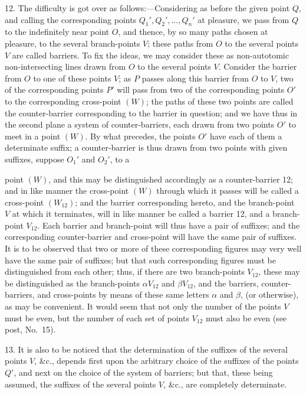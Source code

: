 \documentclass[11pt,a4paper]{article}
\begin{document}
\medskip

12. The difficulty is got over as follows:---Considering as before the given point $Q$, and calling the corresponding points $Q_{1}', Q_{2}', \ldots, Q_{n}'$ at pleasure, we pass from $Q$ to the indefinitely near point $O$, and thence, by so many paths chosen at pleasure, to the several branch-points $V$; these paths from $O$ to the several points $V$ are called barriers. To fix the ideas, we may consider these as non-autotomic non-intersecting lines drawn from $O$ to the several points $V$. Consider the barrier from $O$ to one of these points $V$; as $P$ passes along this barrier from $O$ to $V$, two of the corresponding points $P'$ will pass from two of the corresponding points $O'$ to the corresponding cross-point $(W)$; the paths of these two points are called the counter-barrier corresponding to the barrier in question; and we have thus in the second plane a system of counter-barriers, each drawn from two points $O'$ to meet in a point $(W)$. By what precedes, the points $O'$ have each of them a determinate suffix; a counter-barrier is thus drawn from two points with given suffixes, suppose $O_{1}'$ and $O_{2}'$, to a

\newpage


\noindent point $(W)$, and this may be distinguished accordingly as a counter-barrier 12; and in like manner the cross-point $(W)$ through which it passes will be called a cross-point $(W_{12})$; and the barrier corresponding hereto, and the branch-point $V$ at which it terminates, will in like manner be called a barrier 12, and a branch-point $V_{12}$. Each barrier and branch-point will thus have a pair of suffixes; and the corresponding counter-barrier and cross-point will have the same pair of suffixes. It is to be observed that two or more of these corresponding figures may very well have the same pair of suffixes; but that such corresponding figures must be distinguished from each other; thus, if there are two branch-points $V_{12}$, these may be distinguished as the branch-points $\alpha V_{12}$ and $\beta V_{12}$, and the barriers, counter-barriers, and cross-points by means of these same letters $\alpha$ and $\beta$, (or otherwise), as may be convenient. It would seem that not only the number of the points $V$ must be even, but the number of each set of points $V_{12}$ must also be even (see post, No.~15).

\medskip

13. It is also to be noticed that the determination of the suffixes of the several points $V$, \&c., depends first upon the arbitrary choice of the suffixes of the points $Q'$, and next on the choice of the system of barriers; but that, these being assumed, the suffixes of the several points $V$, \&c., are completely determinate.
\end{document}
